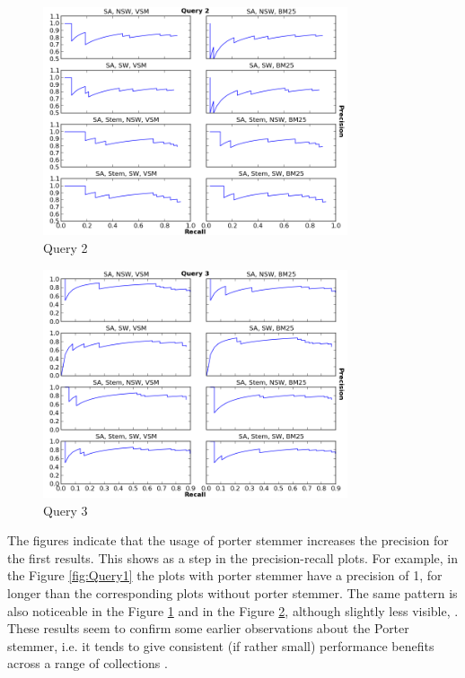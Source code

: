 \begin{figure}[ht]
  \centering
  \includegraphics[width=0.8\textwidth]{Query2.png}
  \caption{Query 2 }
  \label{fig:Query2}
\end{figure}
\FloatBarrier

\begin{figure}[ht]
  \centering
  \includegraphics[width=0.8\textwidth]{Query3.png}
  \caption{Query 3 }
  \label{fig:Query3}
\end{figure}
\FloatBarrier


The figures indicate that the usage of porter stemmer increases the precision for the first results. This shows as a step in the precision-recall plots. For example, in the Figure \ref{fig:Query1} the plots with porter stemmer have a precision of 1, for longer than the corresponding plots without porter stemmer. The same pattern is also noticeable in the Figure \ref{fig:Query2} and in the Figure \ref{fig:Query3}, although slightly less visible, . These results seem to confirm some earlier observations about the Porter stemmer, i.e. it tends to give consistent (if rather small) performance benefits across a range of collections \citep{croft1994corpus}. 

